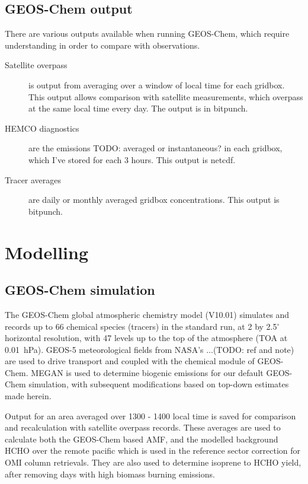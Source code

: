   \subsection{GEOS-Chem output}
    There are various outputs available when running GEOS-Chem, which require understanding in order to compare with observations.
    \begin{description}
      \item[Satellite overpass] is output from averaging over a window of local time for each gridbox. 
      This output allows comparison with satellite measurements, which overpass at the same local time every day.
      The output is in bitpunch.
      \item[HEMCO diagnostics] are the emissions TODO: averaged or instantaneous? in each gridbox, which I've stored for each 3 hours.
      This output is netcdf.
      \item[Tracer averages] are daily or monthly averaged gridbox concentrations.
      This output is bitpunch.
    
  \end{description}

\section{Modelling}
  \label{BioIsop:Model}

  \subsection{GEOS-Chem simulation}
    \label{BioIsop:Model:GC}
    The GEOS-Chem global atmospheric chemistry model (V10.01) simulates and records up to 66 chemical species (tracers) in the standard run, at 2 by 2.5$^{\circ}$ horizontal resolution, with 47 levels up to the top of the atmosphere (TOA at 0.01~hPa). 
    GEOS-5 meteorological fields from NASA's ...(TODO: ref and note) are used to drive transport and coupled with the chemical module of GEOS-Chem.
    MEGAN is used to determine biogenic emissions for our default GEOS-Chem simulation, with subsequent modifications based on top-down estimates made herein.
    
    Output for an area averaged over 1300 - 1400 local time is saved for comparison and recalculation with satellite overpass records.
    These averages are used to calculate both the GEOS-Chem based AMF, and the modelled background HCHO over the remote pacific which is used in the reference sector correction for OMI column retrievals.
    They are also used to determine isoprene to HCHO yield, after removing days with high biomass burning emissions.

